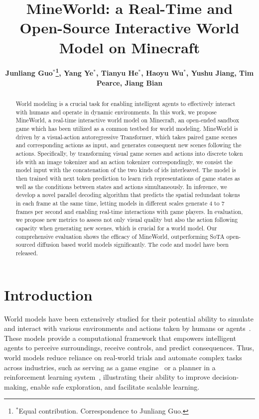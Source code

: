 \documentclass{article} %
\title{MineWorld: a Real-Time and Open-Source Interactive World Model on Minecraft}
\author{
\textbf{Junliang Guo$^*$\thanks{$^*$Equal contribution. Correspondence to Junliang Guo.}, Yang Ye$^*$, Tianyu He$^*$, Haoyu Wu$^*$, Yushu Jiang, Tim Pearce, Jiang Bian}}
\affil{
Microsoft Research \\ 
{\footnotesize \texttt{\{junliangguo,v-yangye,tianyuhe, v-haoywu\}@microsoft.com}}
}
\affil{
\url{https://aka.ms/mineworld}
}
\begin{document}
\maketitle

\begin{abstract}
World modeling is a crucial task for enabling intelligent agents to effectively interact with humans and operate in dynamic environments. In this work, we propose MineWorld, a real-time interactive world model on Minecraft, an open-ended sandbox game which has been utilized as a common testbed for world modeling. MineWorld is driven by a visual-action autoregressive Transformer, which takes paired game scenes and corresponding actions as input, and generates consequent new scenes following the actions. Specifically, by transforming visual game scenes and actions into discrete token ids with an image tokenizer and an action tokenizer correspondingly, we consist the model input with the concatenation of the two kinds of ids interleaved. The model is then trained with next token prediction to learn rich representations of game states as well as the conditions between states and actions simultaneously. In inference, we develop a novel parallel decoding algorithm that predicts the spatial redundant tokens in each frame at the same time, letting models in different scales generate $4$ to $7$ frames per second and enabling real-time interactions with game players.
In evaluation, we propose new metrics to assess not only visual quality but also the action following capacity when generating new scenes, which is crucial for a world model. Our comprehensive evaluation shows the efficacy of MineWorld, outperforming SoTA open-sourced diffusion based world models significantly. The code and model have been released.
\end{abstract}

\section{Introduction}
\label{sec:intro}

World models have been extensively studied for their potential ability to simulate and interact with various environments and actions taken by humans or agents~\citep{ha2018world,yang2023learning}. These models provide a computational framework that empowers intelligent agents to perceive surroundings, receive controls, and predict consequences. Thus, world models reduce reliance on real-world trials and automate complex tasks across industries, such as serving as a game engine~\citep{valevski2024diffusion,bruce2024genie,oasis2024,kanervisto2025world} or a planner in a reinforcement learning system~\citep{hafner2019dream,wu2024ivideogpt,agarwal2025cosmos}, illustrating their ability to improve decision-making, enable safe exploration, and facilitate scalable learning.
\end{document}
